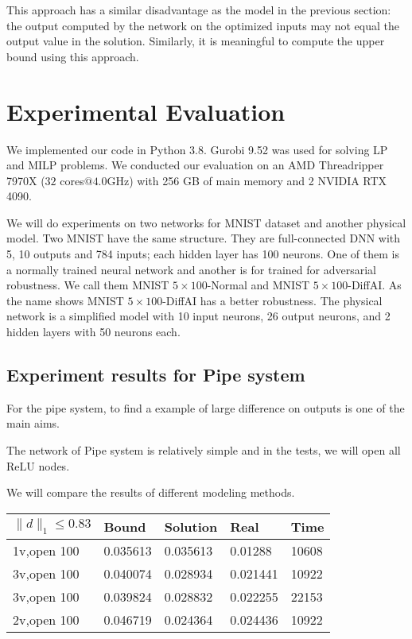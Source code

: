 \documentclass[letterpaper]{article} %
\newcommand{\ReLU}{\mathrm{ReLU}}
\begin{document}
	This approach has a similar disadvantage as the model in the previous section: the output computed by the network on the optimized inputs may not equal the output value in the solution. Similarly, it is meaningful to compute the upper bound using this approach. 
	
	
	
	\section{Experimental Evaluation}
	
	We implemented our code in Python 3.8.
	Gurobi 9.52 was used for solving LP and MILP problems. We conducted our evaluation on an AMD Threadripper 7970X  ($32$ cores$@4.0$GHz) with 256 GB of main memory and 2 NVIDIA RTX 4090. 
	
	We will do experiments on two networks for MNIST dataset and another physical model. Two MNIST have the same structure. They are full-connected DNN with 5, 10 outputs and 784 inputs; each hidden layer has 100 neurons. One of them is a normally trained neural network and another is for trained for adversarial robustness. We call them MNIST $5\times100$-Normal and MNIST $5\times 100$-DiffAI. As the name shows MNIST $5\times 100$-DiffAI has a better robustness. The physical network is a simplified model with 10 input neurons, 26 output neurons, and 2 hidden layers with 50 neurons each.
	
	\subsection{Experiment results for Pipe system}
	
	For the pipe system, to find a example of large difference on outputs is one of the main aims.
	
	The network of Pipe system is relatively simple and in the tests, we will open all $\ReLU$ nodes.
	
	We will compare the results of different modeling methods.
	
	\vspace*{1ex}
	
	\begin{tabular}{|l|l|l|l|l|}\hline
		$\|d\|_1\leq 0.83$ &        Bound &  Solution &                          Real &  Time \\\hline
		1v,open 100 &     0.035613 &  0.035613 &                       0.01288 & 10608 \\\hline
		3v,open 100 &     0.040074 &  0.028934 &                      0.021441 & 10922 \\\hline
		3v,open 100 &     0.039824 &  0.028832 &                      0.022255 & 22153 \\\hline
		2v,open 100 &     0.046719 &  0.024364 &                      0.024436 & 10922 \\\hline
	\end{tabular}
	
\end{document}
